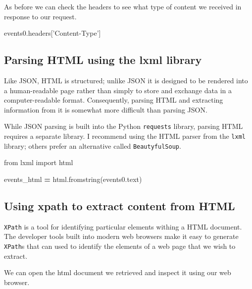 \documentclass[]{book}
\newenvironment{Shaded}{\begin{snugshade}}{\end{snugshade}}
\newcommand{\ImportTok}[1]{#1}
\newcommand{\NormalTok}[1]{#1}
\newcommand{\OperatorTok}[1]{\textcolor[rgb]{0.81,0.36,0.00}{\textbf{#1}}}
\newcommand{\StringTok}[1]{\textcolor[rgb]{0.31,0.60,0.02}{#1}}
\begin{document}
As before we can check the headers to see what type of content we
received in response to our request.

\begin{Shaded}
\begin{Highlighting}[]
\NormalTok{events0.headers[}\StringTok{'Content-Type'}\NormalTok{]}
\end{Highlighting}
\end{Shaded}

\hypertarget{parsing-html-using-the-lxml-library}{%
\subsection{Parsing HTML using the lxml library}\label{parsing-html-using-the-lxml-library}}

Like JSON, HTML is structured; unlike JSON it is designed to be
rendered into a human-readable page rather than simply to store and
exchange data in a computer-readable format. Consequently, parsing
HTML and extracting information from it is somewhat more difficult
than parsing JSON.

While JSON parsing is built into the Python \texttt{requests} library, parsing
HTML requires a separate library. I recommend using the HTML parser
from the \texttt{lxml} library; others prefer an alternative called
\texttt{BeautyfulSoup}.

\begin{Shaded}
\begin{Highlighting}[]
\ImportTok{from}\NormalTok{ lxml }\ImportTok{import}\NormalTok{ html}

\NormalTok{events_html }\OperatorTok{=}\NormalTok{ html.fromstring(events0.text)}
\end{Highlighting}
\end{Shaded}

\hypertarget{using-xpath-to-extract-content-from-html}{%
\subsection{Using xpath to extract content from HTML}\label{using-xpath-to-extract-content-from-html}}

\texttt{XPath} is a tool for identifying particular elements withing a HTML
document. The developer tools built into modern web browsers make it
easy to generate \texttt{XPath}s that can used to identify the elements of a
web page that we wish to extract.

We can open the html document we retrieved and inspect it using
our web browser.
\end{document}
